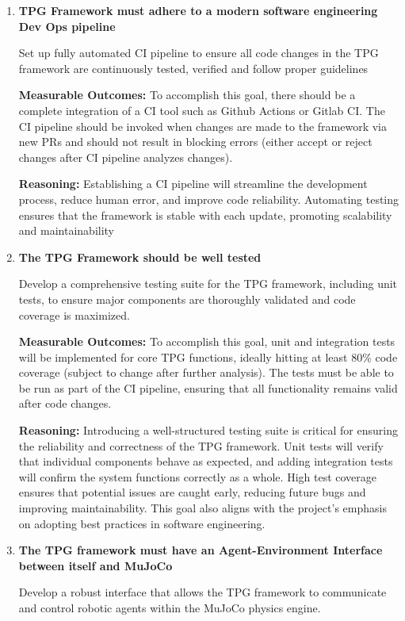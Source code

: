 \documentclass{article}
\begin{document}
\begin{enumerate}
    \item \textbf{TPG Framework must adhere to a modern software engineering Dev Ops pipeline}
    
    Set up fully automated CI pipeline to ensure all code changes in the TPG framework are continuously tested, verified and follow proper guidelines


\textbf{Measurable Outcomes: 
} To accomplish this goal, there should be a complete integration of a CI tool such as Github Actions or Gitlab CI. The CI pipeline should be invoked when changes are made to the framework via new PRs and should not result in blocking errors (either accept or reject changes after CI pipeline analyzes changes). 

\textbf{Reasoning: } Establishing a CI pipeline will streamline the development process, reduce human error, and improve code reliability. Automating testing ensures that the framework is stable with each update, promoting scalability and maintainability

\item \textbf{ The TPG Framework should be well tested}

Develop a comprehensive testing suite for the TPG framework, including unit tests, to ensure major components are thoroughly validated and code coverage is maximized.

\textbf{Measurable Outcomes:
}To accomplish this goal, unit and integration tests will be implemented for core TPG functions, ideally hitting at least 80\% code coverage (subject to change after further analysis). The tests must be able to be run as part of the CI pipeline, ensuring that all functionality remains valid after code changes.


\textbf{Reasoning:} Introducing a well-structured testing suite is critical for ensuring the reliability and correctness of the TPG framework. Unit tests will verify that individual components behave as expected, and adding integration tests will confirm the system functions correctly as a whole. High test coverage ensures that potential issues are caught early, reducing future bugs and improving maintainability. This goal also aligns with the project’s emphasis on adopting best practices in software engineering.

\item \textbf{The TPG framework must have an Agent-Environment Interface between itself and MuJoCo}

Develop a robust interface that allows the TPG framework to communicate and control robotic agents within the MuJoCo physics engine.


\end{enumerate}
\end{document}
